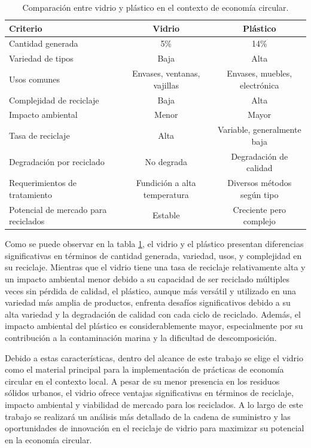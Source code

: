 \documentclass[main.tex]{subfiles}
\begin{document}
\begin{table}[h!]
\centering
\begin{tabular}{|l|c|c|}
\hline
\textbf{Criterio} & \textbf{Vidrio} & \textbf{Plástico} \\ \hline
Cantidad generada & 5\% & 14\% \\ \hline
Variedad de tipos & Baja & Alta \\ \hline
Usos comunes & Envases, ventanas, vajillas & Envases, muebles, electrónica \\ \hline
Complejidad de reciclaje & Baja & Alta \\ \hline
Impacto ambiental & Menor & Mayor \\ \hline
Tasa de reciclaje & Alta & Variable, generalmente baja \\ \hline
Degradación por reciclado & No degrada & Degradación de calidad \\ \hline
Requerimientos de tratamiento & Fundición a alta temperatura & Diversos métodos según tipo \\ \hline
Potencial de mercado para reciclados & Estable & Creciente pero complejo \\ \hline
\end{tabular}
\caption{Comparación entre vidrio y plástico en el contexto de economía circular.}
\label{tab:glass-vs-plastic}
\end{table}

Como se puede observar en la tabla \ref{tab:glass-vs-plastic}, el vidrio y el plástico presentan diferencias significativas en términos de cantidad generada, variedad, usos, y complejidad en su reciclaje. Mientras que el vidrio tiene una tasa de reciclaje relativamente alta y un impacto ambiental menor debido a su capacidad de ser reciclado múltiples veces sin pérdida de calidad, el plástico, aunque más versátil y utilizado en una variedad más amplia de productos, enfrenta desafíos significativos debido a su alta variedad y la degradación de calidad con cada ciclo de reciclado. Además, el impacto ambiental del plástico es considerablemente mayor, especialmente por su contribución a la contaminación marina y la dificultad de descomposición.

Debido a estas características, dentro del alcance de este trabajo se elige el vidrio como el material principal para la implementación de prácticas de economía circular en el contexto local. A pesar de su menor presencia en los residuos sólidos urbanos, el vidrio ofrece ventajas significativas en términos de reciclaje, impacto ambiental y viabilidad de mercado para los reciclados. A lo largo de este trabajo se realizará un análisis más detallado de la cadena de suministro y las oportunidades de innovación en el reciclaje de vidrio para maximizar su potencial en la economía circular.
\end{document}
